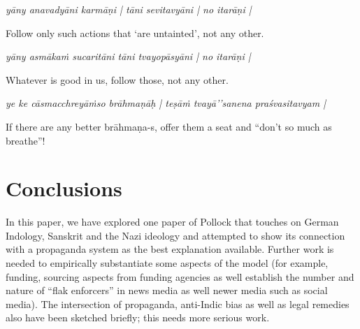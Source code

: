\begin{myquote}
{\sl yāny anavadyāni karmāṇi | tāni sevitavyāni | no itarāṇi |}

{\rm Follow only such actions that `are untainted', not any other.}

{\sl yāny asmākaṁ sucaritāni tāni tvayopāsyāni | no itarāṇi |}

{\rm Whatever is good in us, follow those, not any other.}

{\sl ye ke cāsmacchreyāṁso brāhmaṇāḥ | teṣāṁ tvayā’’sanena praśvasitavyam |}

{\rm If there are any better brāhmaṇa-s, offer them a seat and “don't so much as breathe”!}
\end{myquote}

\section*{Conclusions}

In this paper, we have explored one paper of Pollock that touches on German Indology, Sanskrit and the Nazi ideology and attempted to show its connection with a propaganda system as the best explanation available. Further work is needed to empirically substantiate some aspects of the model (for example, funding, sourcing aspects from funding agencies as well establish the number and nature of “flak enforcers” in news media as well newer media such as social media). The intersection of propaganda, anti-Indic bias as well as legal remedies also have been sketched briefly; this needs more serious work.


